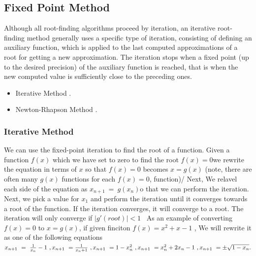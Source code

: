 \documentclass{article}
\begin{document}
\subsection{Fixed Point Method}
Although all root-finding algorithms proceed by iteration, an iterative root-finding method generally uses a specific type of iteration, consisting of defining an auxiliary function, which is applied to the last computed approximations of a root for getting a new approximation. The iteration stops when a fixed point (up to the desired precision) of the auxiliary function is reached, that is when the new computed value is sufficiently close to the preceding ones.\\
\begin{center}
    \begin{itemize}
        \item Iterative Method .
        \item Newton-Rhapson Method .
    \end{itemize}
\end{center}
\subsubsection{Iterative Method}
We can use the fixed-point iteration to find the root of a function. Given a function $ f(x)$ which we have set to zero to find the root $f(x) = 0$we rewrite the equation in terms of $x$ so that $f(x) = 0$ becomes $x = g(x)$ (note, there are often many $g(x)$ functions for each $f(x) = 0$, function)/ Next, We relavel each side of the equation as $x_{n+1} \ =\ g( x_{n})$o that we can perform the iteration. Next, we pick a value for $x_1$ and perform the iteration until it converges towards a root of the function. If the iteration converges, it will converge to a root. The iteration will only converge if $|g'( root) |< 1$ \
As an example of converting $f(x) = 0 $ to $ x = g(x) $, if given finciton $f(x) = x^2+x-1$ , We will rewrite it as one of the following equations \\
$
x_{n+1} \ =\ \frac{1}{x_{n}} -1\ ,\\
x_{n+1} \ =\frac{1}{x_{n} +1} \ ,\\
x_{n+1} \ =1-x_{n}^{2} \ ,\\
x_{n+1} \ =x_{n}^{2} +2x_{n} -1\ ,\ \\
x_{n+1} \ =\pm \sqrt{1-x_{n}} .
$
\end{document}
